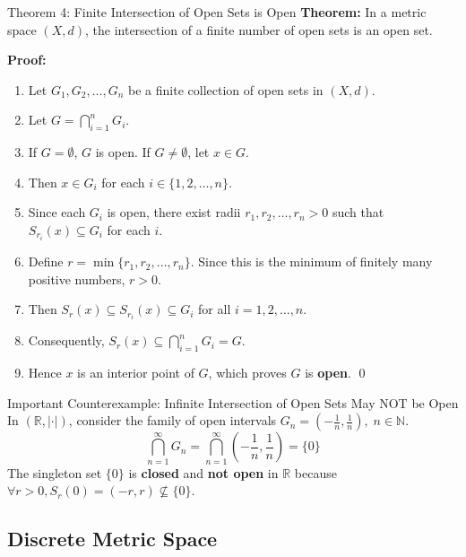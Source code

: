 \documentclass[11pt,a4paper]{article}
\begin{document}
\begin{exbox}{Theorem 4: Finite Intersection of Open Sets is Open}
\textbf{Theorem:} In a metric space $(X, d)$, the intersection of a finite number of open sets is an open set.

\textbf{Proof:}
\begin{enumerate}
    \item Let $G_1, G_2, \dots, G_n$ be a finite collection of open sets in $(X, d)$.
    \item Let $G = \bigcap_{i=1}^n G_i$.
    \item If $G = \emptyset$, $G$ is open. If $G \neq \emptyset$, let $x \in G$.
    \item Then $x \in G_i$ for each $i \in \{1, 2, \dots, n\}$.
    \item Since each $G_i$ is open, there exist radii $r_1, r_2, \dots, r_n > 0$ such that $S_{r_i}(x) \subseteq G_i$ for each $i$.
    \item Define $r = \min \{r_1, r_2, \dots, r_n\}$. Since this is the minimum of finitely many positive numbers, $r > 0$.
    \item Then $S_r(x) \subseteq S_{r_i}(x) \subseteq G_i$ for all $i = 1, 2, \dots, n$.
    \item Consequently, $S_r(x) \subseteq \bigcap_{i=1}^n G_i = G$.
    \item Hence $x$ is an interior point of $G$, which proves $G$ is \textbf{open}. \qed
\end{enumerate}
\end{exbox}

\begin{formulabox}{Important Counterexample: Infinite Intersection of Open Sets May NOT be Open}
In $(\mathbb{R}, |\cdot|)$, consider the family of open intervals $G_n = \left(-\frac{1}{n}, \frac{1}{n}\right), \; n \in \mathbb{N}$.
\begin{equation}
    \bigcap_{n=1}^\infty G_n = \bigcap_{n=1}^\infty \left(-\frac{1}{n}, \frac{1}{n}\right) = \{0\}
\end{equation}
The singleton set $\{0\}$ is \textbf{closed} and \textbf{not open} in $\mathbb{R}$ because $\forall r > 0, S_r(0) = (-r, r) \not\subseteq \{0\}$.
\end{formulabox}

\subsection{Discrete Metric Space}
\end{document}
